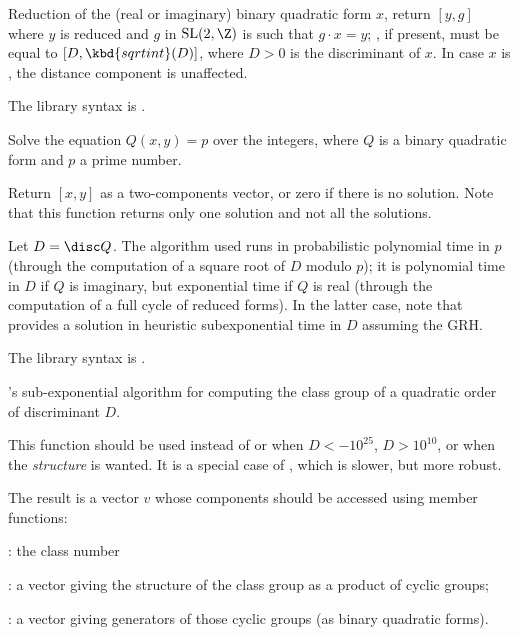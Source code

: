 \label{se:qfbredsl2}
Reduction of the (real or imaginary) binary quadratic form $x$, return
$[y,g]$ where $y$ is reduced and $g$ in $\text{SL}(2,\Z)$ is such that
 $g \cdot x = y$; , if
present, must be equal to $[D, \kbd{sqrtint}(D)]$, where $D > 0$ is the
discriminant of $x$. In case $x$ is , the distance component is
unaffected.

The library syntax is .

\label{se:qfbsolve}
Solve the equation $Q(x,y)=p$ over the integers,
where $Q$ is a binary quadratic form and $p$ a prime number.

Return $[x,y]$ as a two-components vector, or zero if there is no solution.
Note that this function returns only one solution and not all the solutions.

Let $D = \disc Q$. The algorithm used runs in probabilistic polynomial time
in $p$ (through the computation of a square root of $D$ modulo $p$); it is
polynomial time in $D$ if $Q$ is imaginary, but exponential time if $Q$ is
real (through the computation of a full cycle of reduced forms). In the
latter case, note that  provides a solution in heuristic
subexponential time in $D$ assuming the GRH.

The library syntax is .

\label{se:quadclassunit}
's sub-exponential algorithm for computing the
class group of a quadratic order of discriminant $D$.

This function should be used instead of  or 
when $D<-10^{25}$, $D>10^{10}$, or when the \emph{structure} is wanted. It
is a special case of , which is slower, but more robust.

The result is a vector $v$ whose components should be accessed using member
functions:

\item {}: the class number

\item {}: a vector giving the structure of the class group as a
product of cyclic groups;

\item {}: a vector giving generators of those cyclic groups (as
binary quadratic forms).

